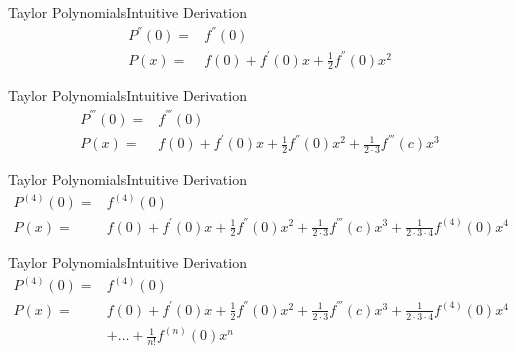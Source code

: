 \documentclass[10pt]{beamer}
\begin{document}
\begin{frame}{Taylor Polynomials}{Intuitive Derivation}
	\begin{align*}
	P^{''}\left(0\right)=&f^{''}\left(0\right)\\
	P\left(x\right)=&f\left(0\right)+f^{'}\left(0\right)x+\frac{1}{2}f^{''}\left(0\right)x^2
	\end{align*}
	
\end{frame}

\begin{frame}{Taylor Polynomials}{Intuitive Derivation}
	\begin{align*}
	P^{'''}\left(0\right)=&f^{'''}\left(0\right)\\
	P\left(x\right)=&f\left(0\right)+f^{'}\left(0\right)x+\frac{1}{2}f^{''}\left(0\right)x^2+\frac{1}{2\cdot 3}f^{'''}\left(c\right)x^3
	\end{align*}
	
\end{frame}

\begin{frame}{Taylor Polynomials}{Intuitive Derivation}
	\begin{align*}
	P^{\left(4\right) }\left(0\right)=&f^{\left(4\right)}\left(0\right)\\
	P\left(x\right)=&f\left(0\right)+f^{'}\left(0\right)x+\frac{1}{2}f^{''}\left(0\right)x^2+\frac{1}{2\cdot 3}f^{'''}\left(c\right)x^3+\frac{1}{2\cdot 3\cdot 4}f^{(4)}\left(0\right)x^4
	\end{align*}
	
\end{frame}

\begin{frame}{Taylor Polynomials}{Intuitive Derivation}
	\begin{align*}
	P^{\left(4\right) }\left(0\right)=&f^{\left(4\right)}\left(0\right)\\
	P\left(x\right)=&f\left(0\right)+f^{'}\left(0\right)x+\frac{1}{2}f^{''}\left(0\right)x^2+\frac{1}{2\cdot 3}f^{'''}\left(c\right)x^3+\frac{1}{2\cdot 3\cdot 4}f^{(4)}\left(0\right)x^4\\
	&+ \dots +\frac{1}{n!}f^{(n)}\left(0\right)x^n
	\end{align*}
	
\end{frame}
\end{document}
